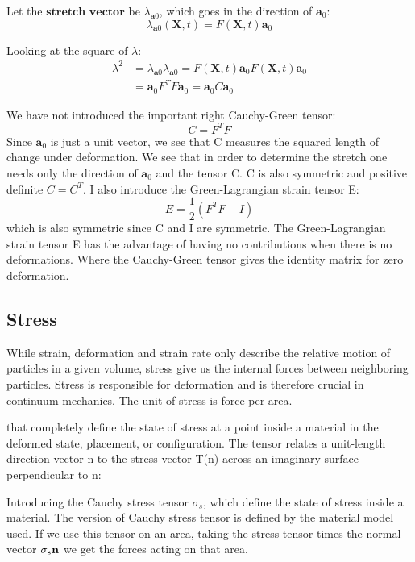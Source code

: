 Let the $\textbf{stretch vector}$ be $\lambda_{\textbf{a}0}$, which goes in the direction of $\textbf{a}_0$: 
\begin{equation}
\lambda_{\textbf{a}0}(\textbf{X},t) = F(\textbf{X},t)\textbf{a}_0 
\end{equation}

Looking at the square of $\lambda$:
\begin{align}
\lambda^2 &=  \lambda_{\textbf{a}0} \lambda_{\textbf{a}0} = F(\textbf{X},t)\textbf{a}_0 F(\textbf{X},t)\textbf{a}_0 \\
&= \textbf{a}_0 F^TF\textbf{a}_0 = \textbf{a}_0 C \textbf{a}_0
\end{align}

We have not introduced the important right Cauchy-Green tensor:
 \begin{equation}
 C = F^TF
\end{equation}
Since $\textbf{a}_0 $ is just a unit vector, we see that C measures the squared length of change under deformation. We see that in order to determine the stretch one needs only the direction of $\textbf{a}_0$ and the tensor C.
C is also symmetric and positive definite $C = C^T$.  I also introduce the Green-Lagrangian strain tensor E:
\begin{equation}\label{eq:StrainTensor}
E = \frac{1}{2}(F^TF -I) 
\end{equation}
which is also symmetric since C and I are symmetric. The Green-Lagrangian strain tensor E has the advantage of having no contributions when there is no deformations. Where the Cauchy-Green tensor gives the identity matrix for zero deformation.
		
\subsection{Stress}
While strain, deformation and strain rate only describe the relative motion of particles in a given volume, stress give us the internal forces between neighboring particles. Stress is responsible for deformation and is therefore crucial in continuum mechanics. The unit of stress is force per area.


that completely define the state of stress at a point inside a material in the deformed state, placement, or configuration. The tensor relates a unit-length direction vector n to the stress vector T(n) across an imaginary surface perpendicular to n:


Introducing the Cauchy stress tensor $\sigma_s$, which define the state of stress inside a material. The version of Cauchy stress tensor is defined by the material model used. 
If we use this tensor on an area, taking the stress tensor times the normal vector $\sigma_s \bold{n}$ we get the forces acting on that area.

